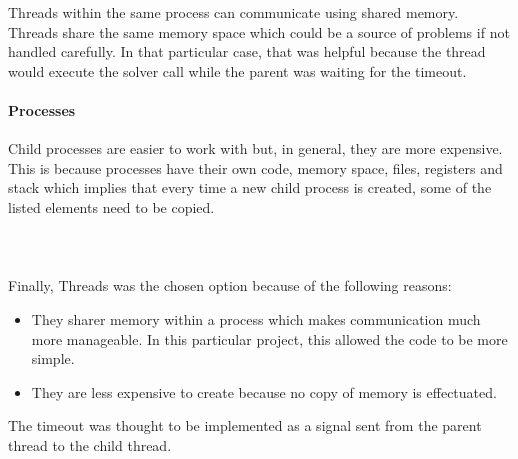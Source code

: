 Threads within the same process can communicate using shared memory. \\
Threads share the same memory space which could be a source of problems if not handled carefully. In that particular case, that was helpful because the thread would execute the solver call while the parent was waiting for the timeout.  

\paragraph{Processes}

Child processes are easier to work with but, in general, they are more expensive. This is because processes have their own code, memory space, files, registers and stack which implies that every time a new child process is created, some of the listed elements need to be copied.  \\\\\\\\
Finally, Threads was the chosen option because of the following reasons: 

\begin{itemize}
	\item They sharer memory within a process which makes communication much more manageable. In this particular project, this allowed the code to be more simple. 
	\item They are less expensive to create because no copy of memory is effectuated.
\end{itemize}
The timeout was thought to be implemented as a signal sent from the parent thread to the child thread.  


